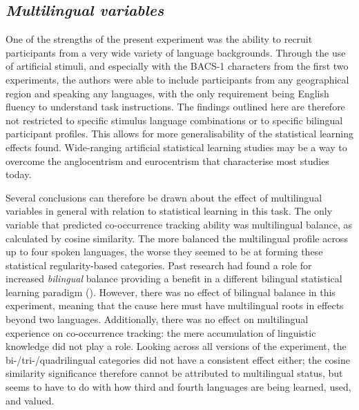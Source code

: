 \subsection{\large{\emph{Multilingual variables}}}
\noindent
One of the strengths of the present experiment was the ability to recruit participants from a very wide variety of language backgrounds. Through the use of artificial stimuli, and especially with the BACS-1 characters from the first two experiments, the authors were able to include participants from any geographical region and speaking any languages, with the only requirement being English fluency to understand task instructions. The findings outlined here are therefore not restricted to specific stimulus language combinations or to specific bilingual participant profiles. This allows for more generalisability of the statistical learning effects found. Wide-ranging artificial statistical learning studies may be a way to overcome the anglocentrism and eurocentrism that characterise most studies today.

Several conclusions can therefore be drawn about the effect of multilingual variables in general with relation to statistical learning in this task. The only variable that predicted co-occurrence tracking ability was multilingual balance, as calculated by cosine similarity. The more balanced the multilingual profile across up to four spoken languages, the worse they seemed to be at forming these statistical regularity-based categories. Past research had found a role for increased \emph{bilingual} balance providing a benefit in a different bilingual statistical learning paradigm (\cite{Onnis2018}). However, there was no effect of bilingual balance in this experiment, meaning that the cause here must have multilingual roots in effects beyond two languages. Additionally, there was no effect on multilingual experience on co-occurrence tracking: the mere accumulation of linguistic knowledge did not play a role. Looking across all versions of the experiment, the bi-/tri-/quadrilingual categories did not have a consistent effect either; the cosine similarity significance therefore cannot be attributed to multilingual status, but seems to have to do with how third and fourth languages are being learned, used, and valued.

